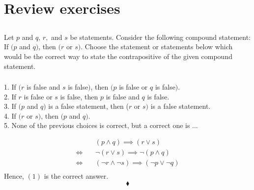 \newpage
\setcounter{section}{28}
 \section{Review exercises}
 \renewcommand{\thesubsection}{\thesection.\RomanNumeralCaps{1}}
\subsection{}
Let $p$ and $q,\, r,$ and $s$ be statements. Consider the following compound statement: If $(p$ and $q)$, then $(r$ or $s)$. Choose the statement or statements below which would be the correct way to state the contrapositive of the given compound statement.
\setcounter{secnumdepth}{4}


 \subsubsection{}
\begin{tcolorbox}
1. If $(r$ is false and $s$ is false$)$, then $(p$ is false or $q$ is false$)$.  \\

2. If $r$ is false or $s$ is false, then $p$ is false and $q$ is false.   \\

3. If $(p$ and $q)$ is a false statement, then ($r$ or $s)$ is a false statement. \\

4. If $(r$ or $s)$, then $(p$ and $q)$. \\ 

5. None of the previous choices is correct, but a correct one is  $\dots$
\end{tcolorbox}
$$ $$
\begin{align*}
&(p \wedge q)\implies (r \vee s)\\
\Leftrightarrow\quad &\lnot (r \vee s)\implies \lnot (p \wedge q)\\
\Leftrightarrow\quad &(\lnot r \wedge \lnot s)\implies (\lnot p \vee \lnot q)\\
\end{align*}
Hence, $(1)$ is the correct answer.
$$\blacklozenge$$




\renewcommand{\thesubsection}{\thesection.\RomanNumeralCaps{2}}
\subsection{}
